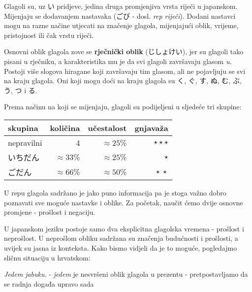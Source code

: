 
\author{Tomislav Mamić}

	
	
	Glagoli su, uz い pridjeve, jedina druga promjenjiva vrsta riječi u japanskom. Mijenjaju se dodavanjem nastavaka (ごび - dosl. \textit{rep riječi}). Dodani nastavci mogu na razne načine utjecati na značenje glagola, mijenjajući oblik, vrijeme, pristojnost ili čak vrstu riječi.
	
	Osnovni oblik glagola zove se \textbf{rječnički oblik} (じしょけい), jer su glagoli tako pisani u rječniku, a karakteristika mu je da svi glagoli završavaju glasom \textit{u}. Postoji više slogova hiragane koji završavaju tim glasom, ali ne pojavljuju se svi na kraju glagola. Oni koji mogu doći na kraju glagola su く, ぐ, す, ぬ, む, ぶ, う, つ i る.
	
	Prema načinu na koji se mijenjaju, glagoli su podijeljeni u sljedeće tri skupine:
	
	\begin{table}[h]
		\centering
		\begin{tabular}{l r r r}\toprule[2pt]
			skupina & količina & učestalost & gnjavaža\\
			\midrule
			nepravilni & 4 & $\approx 25$\% & $\star\star\star$\\
			いちだん & $\approx 33$\% & $\approx 25$\% & $\star$\\
			ごだん & $\approx 66$\% & $\approx 50$\% & $\star\:\star$\\
			\bottomrule[2pt]
		\end{tabular}
	\end{table}

	U repu glagola sadržano je jako puno informacija pa je stoga važno dobro poznavati sve moguće nastavke i oblike. Za početak, naučit ćemo dvije osnovne promjene - prošlost i negaciju.
	
	
	U japanskom jeziku postoje samo dva eksplicitna glagolska vremena - prošlost i neprošlost. U neprošlom obliku sadržana su značenja budućnosti i prošlosti, a uvijek su jasna iz konteksta. Kako bismo vidjeli da je to moguće, pogledajmo sličnu situaciju u hrvatskom:
	
	\vspace{5pt}
	\hspace{10pt} \textit{Jedem jabuku.} - \textit{jedem} je nesvršeni oblik glagola u prezentu - pretpostavljamo da se radnja događa upravo sada
	
